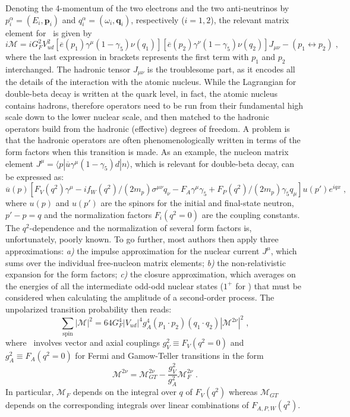 Denoting the 4-momentum of the two electrons and the two anti-neutrinos by
$p^\alpha_i = (E_i,\mathbf{p}_i)$ and $q^\alpha_i = (\omega_i,\mathbf{q}_i)$,
respectively ($i=1,2$), the relevant matrix element for \nnbb\ is given by
\[
  i\mathcal{M} = iG^2_F V^2_{ud}
                 [\overline{e}(p_1) \gamma^\mu (1-\gamma_5) \nu(q_1)]
                 [\overline{e}(p_2) \gamma^\nu (1-\gamma_5) \nu(q_2)]
                 J_{\mu\nu} - (p_1\leftrightarrow p_2) \;,
\]
where the last expression in brackets represents the first term with $p_1$ and
$p_2$ interchanged. The hadronic tensor $J_{\mu\nu}$ is the troublesome part,
as it encodes all the details of the interaction with the atomic nucleus. While
the Lagrangian for double-beta decay is written at the quark level, in fact,
the atomic nucleus contains hadrons, therefore operators need to be run from
their fundamental high scale down to the lower nuclear scale, and then matched
to the hadronic operators build from the hadronic (effective) degrees of
freedom. A problem is that the hadronic operators are often phenomenologically
written in terms of the form factors when this transition is made. As an
example, the nucleon matrix element $J^\mu = \langle{p}| \overline{u}
\gamma^\mu (1-\gamma_5) d |{n}\rangle$, which is relevant for double-beta
decay, can be expressed as:
\[
  \overline{u}(p) \left[
    F_V(q^2)\gamma^\mu
    - if_W(q^2)/(2m_p) \sigma^{\mu\nu} q_\nu
    - F_A\gamma^\mu\gamma_5
    + F_P(q^2)/(2m_p)\gamma_5q_\mu
  \right] u(p')e^{iqx} \;,
\]
where $u(p)$ and $u(p')$ are the spinors for the initial and final-state
neutron, $p'-p=q$ and the normalization factors $F_i(q^2=0)$ are the coupling
constants. The $q^2$-dependence and the normalization of several form factors
is, unfortunately, poorly known.  To go further, most authors then apply three
approximations: \emph{a)} the impulse approximation for the nuclear current
$J^\mu$, which sums over the individual free-nucleon matrix elements; \emph{b)}
the non-relativistic expansion for the form factors; \emph{c)} the closure
approximation, which averages on the energies of all the intermediate odd-odd
nuclear states ($1^+$ for \nnbb) that must be considered when calculating the
amplitude of a second-order process. The unpolarized transition probability
then reads:
\begin{equation}\label{eq:nbb:trans-prob}
  \sum_\text{spin} |\mathcal{M}|^2 = 64 G^4_F |V_{ud}|^4 g^4_A (p_1 \cdot p_2)
                                     (q_1 \cdot q_2) |\mathcal{M}^{2\nu}|^2 \;,
\end{equation}
where \nmet\ involves vector and axial couplings $g^2_V
\equiv F_V(q^2=0)$ and $g^2_A \equiv F_A(q^2=0)$ for Fermi and Gamow-Teller
transitions in the form
\[
  \mathcal{M}^{2\nu} = \mathcal{M}^{2\nu}_{GT} -
                       \frac{g^2_V}{g^2_A} \mathcal{M}^{2\nu}_F \;.
\]
In particular, $\mathcal{M}_F$ depends on the integral over $q$ of $F_V(q^2)$
whereas $\mathcal{M}_{GT}$ depends on the corresponding integrals over linear
combinations of $F_{A,P,W}(q^2)$.

